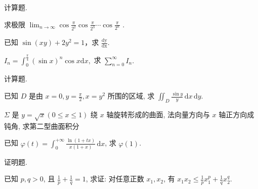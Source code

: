 \par{}
计算题.\par
求极限  $\lim_{n\to\infty}\cos\frac{\pi}{2^{2}}\cos\frac{\pi}{2^{3}}\cdots\cos\frac{\pi}{2^{n}}$ .\par
已知 $\sin (xy) + 2y^2 = 1$，求 $\frac{\mathrm{dy}}{\mathrm{dx}}$.\par
$I_{n} = \int_{0}^{\frac{\pi}{4}}(\sin x)^{n}\cos x\mathrm{d}x,$ 求 $\sum_{n = 0}^{\infty}I_n.$\par
\par{}
计算题.\par
已知 $D$ 是由 $x = 0, y = \frac{\pi}{2}, x = y^2$ 所围的区域, 求 $\iint_{D} \frac{\sin y}{y} \, \mathrm{d}x \, \mathrm{d}y$.\par
\par{}
$\Sigma$ 是 $y = \sqrt{x} (0 \leq x \leq 1)$ 绕 $x$ 轴旋转形成的曲面, 法向量方向与 $x$ 轴正方向成钝角, 求第二型曲面积分\par
\nopagebreak[4]
已知 $\varphi(t) = \int_0^{+\infty} \frac{\ln(1 + tx)}{x(1 + x)} \, \mathrm{d}x$, 求 $\varphi(1)$.\par
\par{}
证明题.\par
已知 $p, q > 0$, 且 $\frac{1}{p} + \frac{1}{q} = 1$, 求证: 对任意正数 $x_{1}, x_{2}$, 有 $x_{1}x_{2} \leq \frac{1}{p} x_{1}^{p} + \frac{1}{q} x_{2}^{q}$.\par
\par{}
